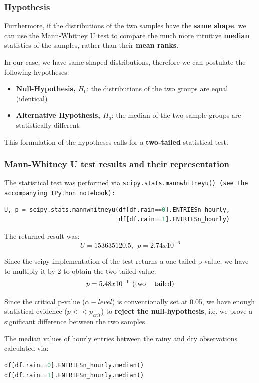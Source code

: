 \documentclass{article}
\begin{document}
\subsubsection{Hypothesis}
Furthermore, if the distributions of the two samples have the \textbf{same shape}, we can use the Mann-Whitney U test to compare the much more intuitive \textbf{median} statistics of the samples, rather than their \textbf{mean ranks}.

In our case, we have same-shaped distributions, therefore we can postulate the following hypotheses:
\begin{itemize}
\item \textbf{Null-Hypothesis, $H_0$}: the distributions of the two groups are equal (identical)
\item \textbf{Alternative Hypothesis, $H_a$}: the median of the two sample groups are statistically different.
\end{itemize}

This formulation of the hypotheses calls for a \textbf{two-tailed} statistical test.

\subsubsection{Mann-Whitney U test results and their representation}

The statistical test was performed via \tt scipy.stats.mannwhitneyu() \rm (see the accompanying IPython notebook):

\begin{lstlisting}[language=Python]
U, p = scipy.stats.mannwhitneyu(df[df.rain==0].ENTRIESn_hourly, 
                                df[df.rain==1].ENTRIESn_hourly)
\end{lstlisting}

The returned result was: $$ U = 153635120.5, \ \ p=2.74x10^{-6}$$

Since the scipy implementation of the test returns a one-tailed p-value, we have to multiply it by 2 to obtain the two-tailed value:
$$ p=5.48x10^{-6} \ \rm (two-tailed)$$

Since the critical p-value ($\alpha-level$) is conventionally set at 0.05, we have enough statistical evidence ($p<<p_{crit}$) to \textbf{reject the null-hypothesis}, i.e. we prove a significant difference between the two samples. 

The median values of hourly entries between the rainy and dry observations calculated via:

\begin{lstlisting}[language=Python]
df[df.rain==0].ENTRIESn_hourly.median()
df[df.rain==1].ENTRIESn_hourly.median()
\end{lstlisting}
\end{document}
